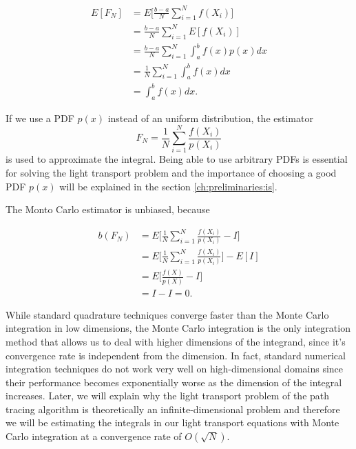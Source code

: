 \begin{equation}
\begin{split}
E[F_N] &= E\Bigg[\frac{b-a}{N}\sum_{i = 1}^{N}f(X_i)\Bigg] \\
&= \frac{b-a}{N}\sum_{i = 1}^{N}E[f(X_i)] \\
&= \frac{b-a}{N}\sum_{i = 1}^{N}\int_{a}^{b}f(x)p(x)dx \\
&= \frac{1}{N}\sum_{i = 1}^{N}\int_{a}^{b}f(x)dx \\
&= \int_{a}^{b}f(x)dx.
\end{split}
\end{equation}
 
If we use a PDF $p(x)$ instead of an uniform distribution, the estimator
\begin{equation}
F_N = \frac{1}{N}\sum_{i = 1}^{N}\frac{f(X_i)}{p(X_i)}
\end{equation} 
is used to approximate the integral. Being able to use arbitrary PDFs is essential for solving the light transport problem and the importance of choosing a good PDF $p(x)$ will be explained in the section \ref{ch:preliminaries:is}.

The Monto Carlo estimator is unbiased, because

\begin{equation}
\begin{split}
b(F_N) &= E\Bigg[\frac{1}{N}\sum_{i = 1}^{N}\frac{f(X_i)}{p(X_i)} - I\Bigg] \\
&= E\Bigg[\frac{1}{N}\sum_{i = 1}^{N}\frac{f(X_i)}{p(X_i)}\Bigg] - E[I] \\
&= E\Bigg[\frac{f(X)}{p(X)} - I\Bigg] \\
&= I - I = 0.
\end{split}
\end{equation}

While standard quadrature techniques converge faster than the Monte Carlo integration in low dimensions, the Monte Carlo integration is the only integration method that allows us to deal with higher dimensions of the integrand, since it's convergence rate is independent from the dimension. In fact, standard numerical integration techniques do not work very well on high-dimensional domains since their performance becomes exponentially worse as the dimension of the integral increases. Later, we will explain why the light transport problem of the path tracing algorithm is theoretically an infinite-dimensional problem and therefore we will be estimating the integrals in our light transport equations with Monte Carlo integration at a convergence rate of $O(\sqrt{N})$. \cite{RMCM}


